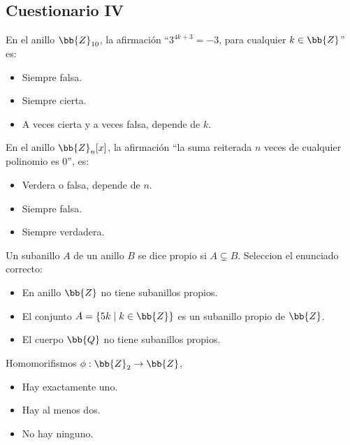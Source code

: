\subsection{Cuestionario IV}
\begin{ejercicio}
    En el anillo $\bb{Z}_{10}$, la afirmación ``$3^{4k+3} = -3$, para cualquier $k \in \bb{Z}$'' es:
    \begin{itemize}
        \item Siempre falsa.
        \item Siempre cierta.
        \item A veces cierta y a veces falsa, depende de $k$.
    \end{itemize}
\end{ejercicio}

\begin{ejercicio}
    En el anillo $\bb{Z}_n[x]$, la afirmación ``la suma reiterada $n$ veces de cualquier polinomio es $0$'', es:
    \begin{itemize}
        \item Verdera o falsa, depende de $n$.
        \item Siempre falsa.
        \item Siempre verdadera.
    \end{itemize}
\end{ejercicio}

\begin{ejercicio}
    Un subanillo $A$ de un anillo $B$ se dice propio si $A \subsetneq B$. Seleccion el enunciado correcto:
    \begin{itemize}
        \item En anillo $\bb{Z}$ no tiene subanillos propios.
        \item El conjunto $A = \{ 5k \mid k \in \bb{Z} \}$ es un subanillo propio de $\bb{Z}$.
        \item El cuerpo $\bb{Q}$ no tiene subanillos propios.
    \end{itemize}
\end{ejercicio}

\begin{ejercicio}
    Homomorifismos $\phi : \bb{Z}_2 \rightarrow \bb{Z}$,
    \begin{itemize}
        \item Hay exactamente uno.
        \item Hay al menos dos.
        \item No hay ninguno.
    \end{itemize}
\end{ejercicio}

